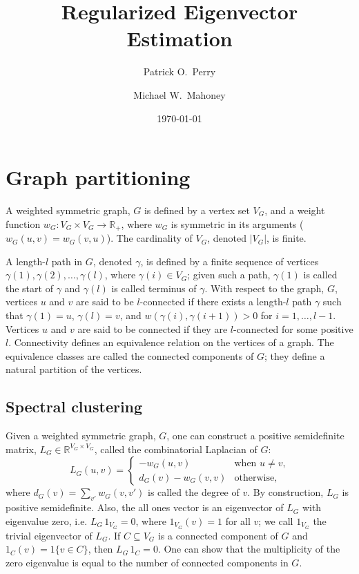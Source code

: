 \documentclass{article}
\newcommand{\reals}{\mathbb{R}}
\begin{document}
\title{
  Regularized Eigenvector Estimation
}
\author{
  Patrick O.\ Perry
  \and
  Michael W.\ Mahoney
}
\date{
  \today
}
\maketitle

\begin{abstract}
\end{abstract}

\section{Graph partitioning}
\label{S:introduction}

A weighted symmetric graph, $G$ is defined by a vertex set $V_G$, and a
weight function $w_G : V_G \times V_G \to \reals_+$, where $w_G$ is symmetric
in its arguments ($w_G(u,v) = w_G(v,u)$).  The cardinality of $V_G$,
denoted $|V_G|$, is finite.

A length-$l$ path in $G$, denoted $\gamma$, is defined by a finite sequence of
vertices $\gamma(1), \gamma(2), \ldots, \gamma(l)$, where $\gamma(i) \in V_G$; given
such a path, $\gamma(1)$ is called the start of $\gamma$ and 
$\gamma(l)$ is called terminus of $\gamma$.  With respect to
the graph, $G$, vertices $u$ and $v$ are said to be $l$-connected if there
exists a length-$l$ path $\gamma$ such that $\gamma(1) = u$,
$\gamma(l) = v$, and $w(\gamma(i), \gamma(i+1)) > 0$ for $i = 1,
\ldots, l-1$.  Vertices $u$ and $v$ are said to be connected if they
are $l$-connected for some positive $l$.  Connectivity defines an
equivalence relation on the vertices of a graph.  The equivalence
classes are called the connected components of $G$; they define a
natural partition of the vertices.

\subsection{Spectral clustering}

Given a weighted symmetric graph, $G$, one can construct a positive
semidefinite matrix, $L_G \in \reals^{V_G \times V_G}$, called the combinatorial Laplacian of $G$:
\[
  L_G(u,v)
  =
  \begin{cases}
    - w_G(u,v) & \text{when $u \neq v$,} \\
    d_G(v) - w_G(v,v) & \text{otherwise,}
  \end{cases}
\]
where $d_G(v) = \sum_{v'} w_G(v,v')$ is called the degree of $v$.
By construction, $L_G$ is positive semidefinite.  Also, the all ones
vector is an eigenvector of $L_G$ with eigenvalue zero, i.e. $L_G \, 1_{V_G}
= 0$, where $1_{V_G}(v) = 1$ for all $v$; we call $1_{V_G}$ the
trivial eigenvector of $L_G$.  If $C \subseteq V_G$ is a connected component of
$G$ and $1_C(v) = 1\{ v \in C \}$, then $L_G \, 1_C = 0$.  One can
show that the multiplicity of the zero eigenvalue is equal to the
number of connected components in $G$.
\end{document}

